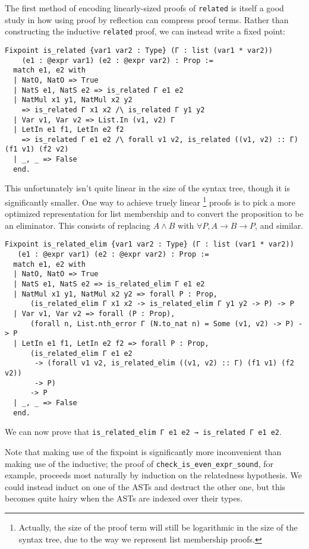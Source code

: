 The first method of encoding linearly-sized proofs of \texttt{related} is itself a good study in how using proof by reflection can compress proof terms.
Rather than constructing the inductive \texttt{related} proof, we can instead write a fixed point:
\begin{verbatim}
Fixpoint is_related {var1 var2 : Type} (Γ : list (var1 * var2))
    (e1 : @expr var1) (e2 : @expr var2) : Prop :=
  match e1, e2 with
  | NatO, NatO => True
  | NatS e1, NatS e2 => is_related Γ e1 e2
  | NatMul x1 y1, NatMul x2 y2
    => is_related Γ x1 x2 /\ is_related Γ y1 y2
  | Var v1, Var v2 => List.In (v1, v2) Γ
  | LetIn e1 f1, LetIn e2 f2
    => is_related Γ e1 e2 /\ forall v1 v2, is_related ((v1, v2) :: Γ) (f1 v1) (f2 v2)
  | _, _ => False
  end.
\end{verbatim}
This unfortunately isn't quite linear in the size of the syntax tree, though it is significantly smaller.
One way to achieve truely linear%
\footnote{%
Actually, the size of the proof term will still be logarithmic in the size of the syntax tree, due to the way we represent list membership proofs.%
}
proofs is to pick a more optimized representation for list membership and to convert the proposition to be an eliminator.
This consists of replacing $A \wedge B$ with $\forall P, A \to B \to P$, and similar.
\begin{verbatim}
Fixpoint is_related_elim {var1 var2 : Type} (Γ : list (var1 * var2))
   (e1 : @expr var1) (e2 : @expr var2) : Prop :=
  match e1, e2 with
  | NatO, NatO => True
  | NatS e1, NatS e2 => is_related_elim Γ e1 e2
  | NatMul x1 y1, NatMul x2 y2 => forall P : Prop,
      (is_related_elim Γ x1 x2 -> is_related_elim Γ y1 y2 -> P) -> P
  | Var v1, Var v2 => forall (P : Prop),
      (forall n, List.nth_error Γ (N.to_nat n) = Some (v1, v2) -> P) -> P
  | LetIn e1 f1, LetIn e2 f2 => forall P : Prop,
      (is_related_elim Γ e1 e2
       -> (forall v1 v2, is_related_elim ((v1, v2) :: Γ) (f1 v1) (f2 v2))
       -> P)
      -> P
  | _, _ => False
  end.
\end{verbatim}
We can now prove that \texttt{is_related_elim Γ e1 e2 → is_related Γ e1 e2}.

Note that making use of the fixpoint is significantly more inconvenient than making use of the inductive; the proof of \texttt{check_is_even_expr_sound}, for example, proceeds most naturally by induction on the relatedness hypothesis.
We could instead induct on one of the ASTs and destruct the other one, but this becomes quite hairy when the ASTs are indexed over their types.


